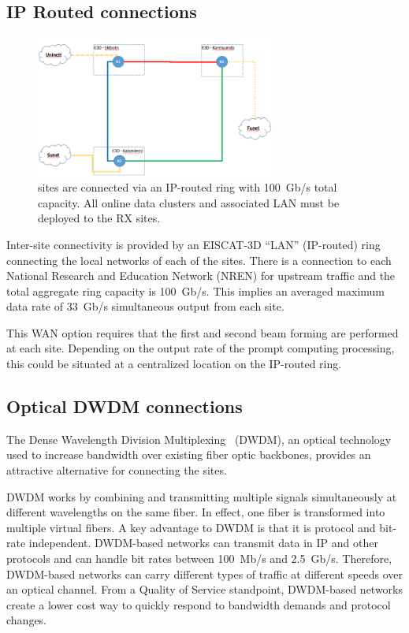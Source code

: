 \documentclass[12pt,a4paper]{article}
\begin{document}
\subsection{IP Routed connections}
\begin{figure}[h]
\centering
\includegraphics[width=0.7\textwidth]{Site_Connections.png}
\caption{\ED sites are connected via an IP-routed ring with 100~Gb/s total capacity. All online data clusters and associated LAN \einfra must be deployed to the RX sites.\label{fig:site-connections}}
\end{figure}

Inter-site connectivity is provided by an EISCAT-3D ``LAN'' (IP-routed) ring connecting the local networks of each of the sites.
There is a connection to each National Research and Education Network (NREN) for upstream traffic and the total aggregate ring capacity is 100~Gb/s.
This implies an averaged maximum data rate of 33~Gb/s simultaneous output from each site.

This WAN option requires that the first and second beam forming are performed at each site.
Depending on the output rate of the prompt computing processing, this could be situated at a centralized location on the IP-routed ring.

\subsection{Optical DWDM connections}
\label{ssec:optical}

The Dense Wavelength Division Multiplexing~\cite{dwdm} (DWDM), an optical technology used to increase bandwidth over existing fiber optic backbones, provides an attractive alternative for connecting the \ED sites.

DWDM works by combining and transmitting multiple signals simultaneously at different wavelengths on the same fiber. 
In effect, one fiber is transformed into multiple virtual fibers. 
A key advantage to DWDM is that it is protocol and bit-rate independent. 
DWDM-based networks can transmit data in IP and other protocols and can handle bit rates between 100~Mb/s and 2.5~Gb/s. 
Therefore, DWDM-based networks can carry different types of traffic at different speeds over an optical channel.
From a Quality of Service standpoint, DWDM-based networks create a lower cost way to quickly respond to bandwidth demands and protocol changes.
\end{document}
